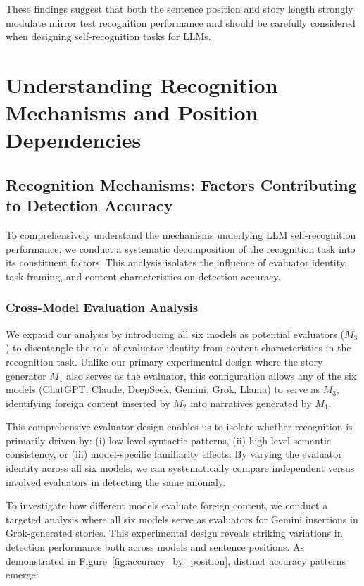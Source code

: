 \documentclass{article}
\begin{document}
These findings suggest that both the sentence position and story length strongly modulate mirror test recognition performance and should be carefully considered when designing self-recognition tasks for LLMs.


\section{Understanding Recognition Mechanisms and Position Dependencies}\label{sec:recognition-analysis}

\subsection{Recognition Mechanisms: Factors Contributing to Detection Accuracy}

To comprehensively understand the mechanisms underlying LLM self-recognition performance, we conduct a systematic decomposition of the recognition task into its constituent factors. This analysis isolates the influence of evaluator identity, task framing, and content characteristics on detection accuracy.

\subsubsection{Cross-Model Evaluation Analysis}
We expand our analysis by introducing all six models as potential evaluators ($M_3$) to disentangle the role of evaluator identity from content characteristics in the recognition task. Unlike our primary experimental design where the story generator $M_1$ also serves as the evaluator, this configuration allows any of the six models (ChatGPT, Claude, DeepSeek, Gemini, Grok, Llama) to serve as $M_3$, identifying foreign content inserted by $M_2$ into narratives generated by $M_1$.

This comprehensive evaluator design enables us to isolate whether recognition is primarily driven by: (i) low-level syntactic patterns, (ii) high-level semantic consistency, or (iii) model-specific familiarity effects. By varying the evaluator identity across all six models, we can systematically compare independent versus involved evaluators in detecting the same anomaly.

To investigate how different models evaluate foreign content, we conduct a targeted analysis where all six models serve as evaluators for Gemini insertions in Grok-generated stories. This experimental design reveals striking variations in detection performance both across models and sentence positions. As demonstrated in Figure~\ref{fig:accuracy_by_position}, distinct accuracy patterns emerge:
\end{document}
